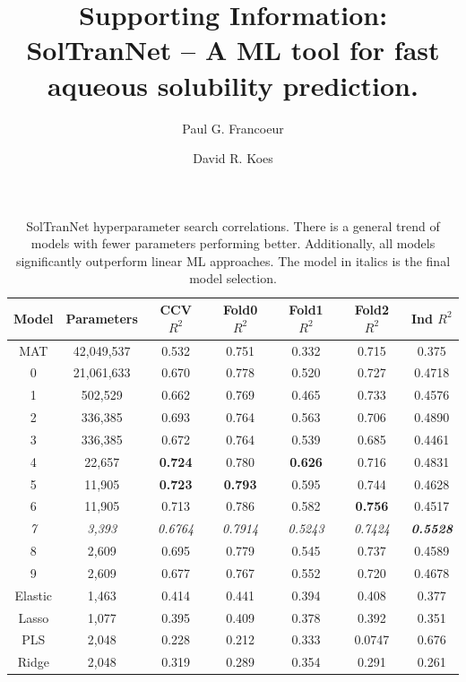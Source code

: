 \documentclass[journal=jcisd8,manuscript=article]{achemso}
\author{Paul G. Francoeur}
\author{David R. Koes}
\affiliation[Pitt]{Department of Computational and Systems Biology, University of Pittsburgh, Pittsburgh, PA 15260}
\title{Supporting Information:\\SolTranNet -- A ML tool for fast aqueous solubility prediction.}
\begin{document}
\begin{table}
    \begin{tabular}{|c|c|c|c|c|c|c|}
        \hline
         Model & Parameters & CCV $R^2$ & Fold0 $R^2$ & Fold1 $R^2$ & Fold2 $R^2$ & Ind $R^2$ \\
         \hline
         MAT & 42,049,537 & 0.532 & 0.751 & 0.332 & 0.715 & 0.375  \\
         \hline
         0 & 21,061,633 & 0.670 & 0.778 & 0.520 & 0.727 & 0.4718 \\
         1 & 502,529 & 0.662 & 0.769 & 0.465 & 0.733 & 0.4576 \\
         2 & 336,385 & 0.693 & 0.764 & 0.563 & 0.706 & 0.4890 \\
         3 & 336,385 & 0.672 & 0.764 & 0.539 & 0.685 & 0.4461 \\
         4 & 22,657 & \textbf{0.724} & 0.780 & \textbf{0.626} & 0.716 & 0.4831 \\
         5 & 11,905 & \textbf{0.723} & \textbf{0.793} & 0.595 & 0.744 & 0.4628 \\
         6 & 11,905 & 0.713 & 0.786 & 0.582 & \textbf{0.756} & 0.4517 \\
         \emph{7} & \emph{3,393} & \emph{0.6764} & \emph{0.7914} & \emph{0.5243} & \emph{0.7424} & \emph{\textbf{0.5528}}\\
         8 & 2,609 & 0.695 & 0.779 & 0.545 & 0.737  & 0.4589\\
         9 & 2,609 & 0.677 & 0.767 & 0.552 & 0.720  & 0.4678\\
         \hline
         Elastic & 1,463 & 0.414 & 0.441 & 0.394 & 0.408  & 0.377\\
         Lasso & 1,077 & 0.395 & 0.409 & 0.378 & 0.392  & 0.351\\
         PLS & 2,048 & 0.228 & 0.212 & 0.333 & 0.0747  & 0.676\\
         Ridge & 2,048 & 0.319 & 0.289 & 0.354 & 0.291 & 0.261 \\
         \hline
    \end{tabular}
    \caption{SolTranNet hyperparameter search correlations. There is a general trend of models with fewer parameters performing better. Additionally, all models significantly outperform linear ML approaches. The model in italics is the final model selection.}
    \label{tab:solsearchr2}
\end{table}
\end{document}
